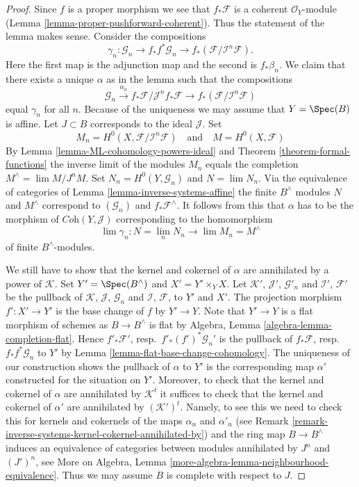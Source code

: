 \begin{proof}
Since $f$ is a proper morphism we see that $f_*\mathcal{F}$
is a coherent $\mathcal{O}_Y$-module
(Lemma \ref{lemma-proper-pushforward-coherent}).
Thus the statement of the lemma makes sense.
Consider the compositions
$$
\gamma_n : \mathcal{G}_n \to
f_*f^*\mathcal{G}_n \to
f_*(\mathcal{F}/\mathcal{I}^n\mathcal{F}).
$$
Here the first map is the adjunction map and the second is $f_*\beta_n$.
We claim that there exists a unique $\alpha$ as in the lemma
such that the compositions
$$
\mathcal{G}_n \xrightarrow{\alpha_n}
f_*\mathcal{F}/\mathcal{J}^nf_*\mathcal{F} \to
f_*(\mathcal{F}/\mathcal{I}^n\mathcal{F})
$$
equal $\gamma_n$ for all $n$. Because of the uniqueness we may assume
that $Y = \Spec(B)$ is affine. Let $J \subset B$ corresponds to the
ideal $\mathcal{J}$. Set
$$
M_n = H^0(X, \mathcal{F}/\mathcal{I}^n\mathcal{F})
\quad\text{and}\quad
M = H^0(X, \mathcal{F})
$$
By Lemma \ref{lemma-ML-cohomology-powers-ideal} and
Theorem \ref{theorem-formal-functions}
the inverse limit of the modules
$M_n$ equals the completion $M^\wedge = \lim M/J^nM$.
Set $N_n = H^0(Y, \mathcal{G}_n)$ and $N = \lim N_n$.
Via the equivalence of categories of
Lemma \ref{lemma-inverse-systems-affine}
the finite $B^\wedge$ modules $N$ and $M^\wedge$ correspond
to $(\mathcal{G}_n)$ and $f_*\mathcal{F}^\wedge$.
It follows from this that $\alpha$ has to be the morphism of
$\textit{Coh}(Y, \mathcal{J})$ corresponding to the homomorphism
$$
\lim \gamma_n : N = \lim_n N_n \longrightarrow \lim M_n = M^\wedge
$$
of finite $B^\wedge$-modules.

\medskip\noindent
We still have to show that the kernel and cokernel of $\alpha$ are
annihilated by a power of $\mathcal{K}$. Set $Y' = \Spec(B^\wedge)$
and $X' = Y' \times_Y X$. Let $\mathcal{K}'$, $\mathcal{J}'$, $\mathcal{G}'_n$
and $\mathcal{I}'$, $\mathcal{F}'$ be the pullback of
$\mathcal{K}$, $\mathcal{J}$, $\mathcal{G}_n$ and
$\mathcal{I}$, $\mathcal{F}$, to $Y'$ and $X'$.
The projection morphism $f' : X' \to Y'$ is the base change of
$f$ by $Y' \to Y$. Note that $Y' \to Y$ is a flat morphism of schemes
as $B \to B^\wedge$ is flat by
Algebra, Lemma \ref{algebra-lemma-completion-flat}.
Hence $f'_*\mathcal{F}'$, resp.\ $f'_*(f')^*\mathcal{G}_n'$
is the pullback of $f_*\mathcal{F}$, resp.\ $f_*f^*\mathcal{G}_n$
to $Y'$ by Lemma \ref{lemma-flat-base-change-cohomology}.
The uniqueness of our construction shows the pullback of $\alpha$ to $Y'$
is the corresponding map $\alpha'$ constructed for the situation on $Y'$.
Moreover, to check that the kernel and cokernel of $\alpha$ are
annihilated by $\mathcal{K}^t$ it suffices to check that the
kernel and cokernel of $\alpha'$ are annihilated by
$(\mathcal{K}')^t$. Namely, to see this we need to check this for
kernels and cokernels of the maps $\alpha_n$ and $\alpha'_n$
(see Remark \ref{remark-inverse-systems-kernel-cokernel-annihilated-by})
and the ring map $B \to B^\wedge$ induces
an equivalence of categories between modules annihilated by
$J^n$ and $(J')^n$, see
More on Algebra, Lemma \ref{more-algebra-lemma-neighbourhood-equivalence}.
Thus we may assume $B$ is complete with respect to $J$.


\end{proof}
